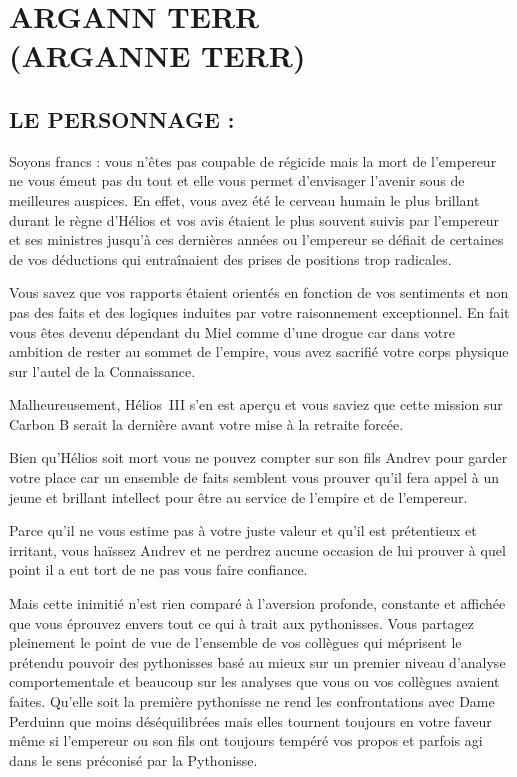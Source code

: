 \documentclass[14pt,twocolumn]{extarticle}
\begin{document}
\section{ARGANN TERR\\(ARGANNE TERR)}

\subsection{LE PERSONNAGE :}

Soyons francs : vous n'êtes pas coupable de régicide mais la mort de
l'empereur ne vous émeut pas du tout et elle vous permet d'envisager l'avenir
sous de meilleures auspices. En effet, vous avez été le cerveau humain le plus
brillant durant le règne d'Hélios et vos avis étaient le plus souvent suivis
par l'empereur et ses ministres jusqu'à ces dernières années ou l'empereur se
défiait de certaines de vos déductions qui entraînaient des prises de positions
trop radicales.

Vous savez que vos rapports étaient orientés en fonction de vos sentiments et
non pas des faits et des logiques induites par votre raisonnement exceptionnel.
En fait vous êtes devenu dépendant du Miel comme d'une drogue car dans votre
ambition de rester au sommet de l'empire, vous avez sacrifié votre corps
physique sur l'autel de la Connaissance.

Malheureusement, Hélios~III s'en est aperçu et vous saviez que cette mission
sur Carbon B serait la dernière avant votre mise à la retraite forcée.

Bien qu'Hélios soit mort vous ne pouvez compter sur son fils Andrev pour garder
votre place car un ensemble de faits semblent vous prouver qu'il fera appel à
un jeune et brillant intellect pour être au service de l'empire et de
l'empereur.

Parce qu'il ne vous estime pas à votre juste valeur et qu'il est prétentieux et
irritant, vous haïssez Andrev et ne perdrez aucune occasion de lui prouver à
quel point il a eut tort de ne pas vous faire confiance.

Mais cette inimitié n'est rien comparé à l'aversion profonde, constante et
affichée que vous éprouvez envers tout ce qui à trait aux pythonisses. Vous
partagez pleinement le point de vue de l'ensemble de vos collègues qui
méprisent le prétendu pouvoir des pythonisses basé au mieux sur un premier
niveau d'analyse comportementale et beaucoup sur les analyses que vous ou vos
collègues avaient faites. Qu'elle soit la première pythonisse ne rend les
confrontations avec Dame Perduinn que moins déséquilibrées mais elles tournent
toujours en votre faveur même si l'empereur ou son fils ont toujours tempéré
vos propos et parfois agi dans le sens préconisé par la Pythonisse.
\end{document}
